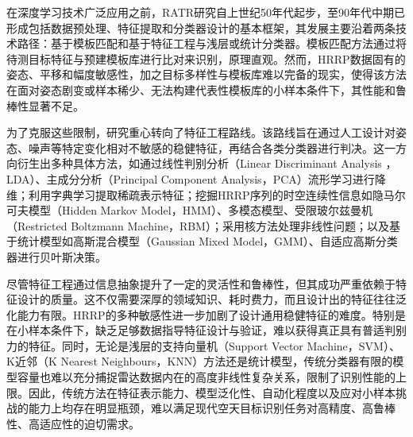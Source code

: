 在深度学习技术广泛应用之前，RATR研究自上世纪50年代起步，至90年代中期已形成包括数据预处理、特征提取和分类器设计的基本框架，其发展主要沿着两条技术路径：基于模板匹配和基于特征工程与浅层或统计分类器。模板匹配方法通过将待测目标特征与预建模板库进行比对来识别，原理直观。然而，HRRP数据固有的姿态、平移和幅度敏感性，加之目标多样性与模板库难以完备的现实，使得该方法在面对姿态剧变或样本稀少、无法构建代表性模板库的小样本条件下，其性能和鲁棒性显著不足。

为了克服这些限制，研究重心转向了特征工程路线。该路线旨在通过人工设计对姿态、噪声等特定变化相对不敏感的稳健特征，再结合各类分类器进行判决。这一方向衍生出多种具体方法，如通过线性判别分析（Linear Discriminant Analysis ，LDA）、主成分分析（Principal Component Analysis，PCA）流形学习进行降维；利用字典学习提取稀疏表示特征；挖掘HRRP序列的时空连续性信息如隐马尔可夫模型（Hidden Markov Model，HMM）、多模态模型、受限玻尔兹曼机（Restricted Boltzmann Machine，RBM）；采用核方法处理非线性问题；以及基于统计模型如高斯混合模型（Gaussian Mixed Model，GMM）、自适应高斯分类器进行贝叶斯决策。

尽管特征工程通过信息抽象提升了一定的灵活性和鲁棒性，但其成功严重依赖于特征设计的质量。这不仅需要深厚的领域知识、耗时费力，而且设计出的特征往往泛化能力有限。HRRP的多种敏感性进一步加剧了设计通用稳健特征的难度。特别是在小样本条件下，缺乏足够数据指导特征设计与验证，难以获得真正具有普适判别力的特征。同时，无论是浅层的支持向量机（Support Vector Machine，SVM）、K近邻（K Nearest Neighbours，KNN）方法还是统计模型，传统分类器有限的模型容量也难以充分捕捉雷达数据内在的高度非线性复杂关系，限制了识别性能的上限。因此，传统方法在特征表示能力、模型泛化性、自动化程度以及应对小样本挑战的能力上均存在明显瓶颈，难以满足现代空天目标识别任务对高精度、高鲁棒性、高适应性的迫切需求。



